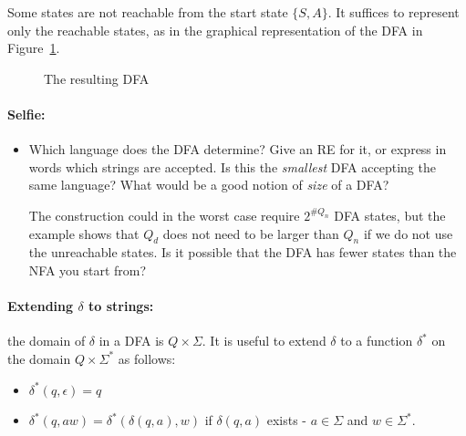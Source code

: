 Some states are not reachable from the start state $\{S,A\}$. It
suffices to represent only the reachable states, as in the graphical
representation of the DFA in Figure~\ref{fsa3}.


\begin{figure}[h]
\caption{The resulting DFA \label{fsa3}}
\end{figure}

\paragraph{Selfie:}
\begin{itemize}
\item[]
Which language does the DFA determine? Give an RE for it, or express
in words which strings are accepted. Is this the {\em smallest} DFA
accepting the same language? What would be a good notion of {\em size}
of a DFA?

The construction could in the worst case require $2^{\#Q_n}$ DFA
states, but the example shows that $Q_d$ does not need to be larger
than $Q_n$ if we do not use the unreachable states. Is it possible
that the DFA has fewer states than the NFA you start from?
\end{itemize}



\paragraph{Extending $\delta$ to strings:} the domain of $\delta$ in a
DFA is $Q \times \Sigma$. It is useful to extend $\delta$ to a
function $\delta^*$ on the domain $Q \times \Sigma^*$ as follows:

\begin{itemize}
\item $\delta^*(q,\epsilon) = q$
\item $\delta^*(q,aw) = \delta^*(\delta(q,a),w)$ if $\delta(q,a)$
exists - $a \in \Sigma$ and $w \in \Sigma^*$.
\end{itemize}

